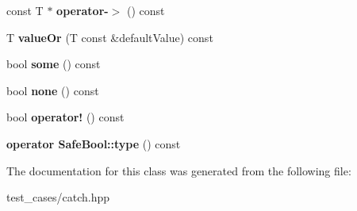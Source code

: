\begin{DoxyCompactItemize}
\mbox{\label{classCatch_1_1Option_ae8343cbc36dbb95b2dce333d2a6fdc28}} 
const T $\ast$ {\bfseries operator-\/$>$} () const
\item 
\mbox{\label{classCatch_1_1Option_a8d9ae2e30b0eb76fe134a6fbc8423124}} 
T {\bfseries value\+Or} (T const \&default\+Value) const
\item 
\mbox{\label{classCatch_1_1Option_a97c95829afbe92f2bcc5fd75b32c0825}} 
bool {\bfseries some} () const
\item 
\mbox{\label{classCatch_1_1Option_a821753afdc3fac947a13a01fbe0d248e}} 
bool {\bfseries none} () const
\item 
\mbox{\label{classCatch_1_1Option_a96dccb86bdf45ee0c08e122b6133bef3}} 
bool {\bfseries operator!} () const
\item 
\mbox{\label{classCatch_1_1Option_a8ed8de7b072f893c85df14913dbbe197}} 
{\bfseries operator Safe\+Bool\+::type} () const
\end{DoxyCompactItemize}


The documentation for this class was generated from the following file\+:\begin{DoxyCompactItemize}
\item 
test\+\_\+cases/catch.\+hpp\end{DoxyCompactItemize}

